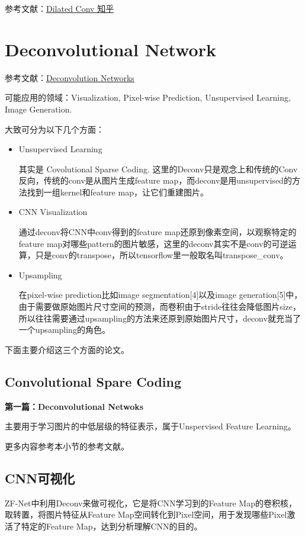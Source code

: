 参考文献：\href{https://www.zhihu.com/search?type=content\&q=dilated\%20CNN}{Dilated Conv 知乎}

\section{Deconvolutional Network}

参考文献：\href{https://www.zhihu.com/question/43609045/answer/132235276}{Deconvolution Networks}

可能应用的领域：Visualization, Pixel-wise Prediction, Unsupervised Learning, Image Generation.

大致可分为以下几个方面：
\begin{itemize}
\item Unsupervised Learning 

其实是 Covolutional Sparse Coding. 这里的Deconv只是观念上和传统的Conv反向，传统的conv是从图片生成feature map，而deconv是用unsupervised的方法找到一组kernel和feature map，让它们重建图片。

\item CNN Visualization

通过deconv将CNN中conv得到的feature map还原到像素空间，以观察特定的feature map对哪些pattern的图片敏感，这里的deconv其实不是conv的可逆运算，只是conv的transpose，所以tensorflow里一般取名叫transpose\_conv。

\item Upsampling

在pixel-wise prediction比如image segmentation[4]以及image generation[5]中，由于需要做原始图片尺寸空间的预测，而卷积由于stride往往会降低图片size， 所以往往需要通过upsampling的方法来还原到原始图片尺寸，deconv就充当了一个upsampling的角色。

\end{itemize}

下面主要介绍这三个方面的论文。

\subsection{Convolutional Spare Coding}

{\bfseries 第一篇：Deconvolutional Netwoks}

主要用于学习图片的中低层级的特征表示，属于Unspervised Feature Learning。

更多内容参考本小节的参考文献。

\subsection{CNN可视化}
ZF-Net中利用Deconv来做可视化，它是将CNN学习到的Feature Map的卷积核，取转置，将图片特征从Feature Map空间转化到Pixel空间，用于发现哪些Pixel激活了特定的Feature Map，达到分析理解CNN的目的。


